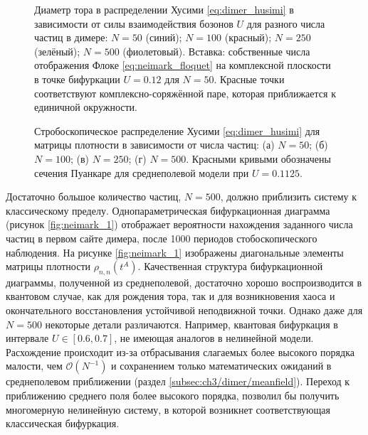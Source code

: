 \begin{figure}[ht]
	\caption[Диаметр тора в распределении Хусими в зависимости от силы взаимодействия бозонов в димере и собственные числа отображения Флоке в точке бифуркации]{
		Диаметр тора в распределении Хусими \cref{eq:dimer_husimi} в зависимости от силы взаимодействия бозонов \(U\) для разного числа частиц в димере: $N = 50$ (синий); $N = 100$ (красный); $N = 250$ (зелёный); $N = 500$ (фиолетовый).
		Вставка: собственные числа отображения Флоке \cref{eq:neimark_floquet} на комплексной плоскости в точке бифуркации \(U=0.12\) для \(N=50\). Красные точки соответствуют комплексно-соряжённой паре, которая приближается к единичной окружности.
	}
	\label{fig:neimark_5}
\end{figure}

\begin{figure}[ht]
	\caption[Стробоскопическое распределение Хусими для матрицы плотности в зависимости от числа частиц в квантовом димере]{
		Стробоскопическое распределение Хусими \cref{eq:dimer_husimi} для матрицы плотности в зависимости от числа частиц: (а) \(N=50\); (б) \(N=100\); (в) \(N=250\); (г) \(N=500\).
		Красными кривыми обозначены сечения Пуанкаре  для среднеполевой модели при \(U=0.1125\).
	}
	\label{fig:neimark_6}
\end{figure}

Достаточно большое количество частиц, \(N = 500\), должно приблизить систему к классическому пределу. Однопараметрическая бифуркационная диаграмма (рисунок \cref{fig:neimark_1}) отображает вероятности нахождения заданного числа частиц в первом сайте димера, после 1000 периодов стобоскопического наблюдения. 
На рисунке \cref{fig:neimark_1} изображены диагональные элементы матрицы плотности \(\rho_{n,n}(t^A)\). 
Качественная структура бифуркационной диаграммы, полученной из среднеполевой, достаточно хорошо воспроизводится в квантовом случае, как для рождения тора, так и для возникновения хаоса и окончательного восстановления устойчивой неподвижной точки. 
Однако даже для \(N = 500\) некоторые детали различаются.
Например, квантовая бифуркация в интервале \(U \in \left[0.6,0.7\right]\), не имеющая аналогов в нелинейной модели.
Расхождение происходит из-за отбрасывания слагаемых более высокого порядка малости, чем $\mathcal{O}(N^{-1})$ и сохранением только математических ожиданий в среднеполевом приближении (раздел \cref{subsec:ch3/dimer/meanfield}).
Переход к приближению среднего поля более высокого порядка, позволил бы получить многомерную нелинейную систему, в которой возникнет соответствующая классическая бифуркация.

